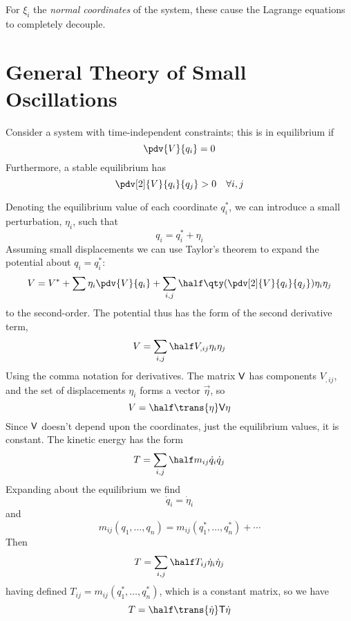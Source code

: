 For $\xi_i$ the \emph{normal coordinates} of the system, these cause
the Lagrange equations to completely decouple.

\section{General Theory of Small Oscillations}
\label{sec:general-theory-small}

Consider a system with time-independent constraints; this is in equilibrium if
\[ \pdv{V}{q_i} = 0 \]
Furthermore, a stable equilibrium has \[ \pdv[2]{V}{q_i}{q_j} > 0 \quad \forall i, j\]

Denoting the equilibrium value of each coordinate $q^{*}_i$, we can
introduce a small perturbation, $\eta_i$, such that
\begin{equation}
  \label{eq:48}
  q_i = q^{*}_i + \eta_i
\end{equation}
Assuming small displacements we can use Taylor's theorem to expand the
potential about $q_i = q_i^{*}$:
\begin{equation}
  \label{eq:49}
  V = V^{*} + \sum \eta_i \pdv{V}{q_i} + \sum_{i,j} \half \qty( \pdv[2]{V}{q_i}{q_j} ) \eta_i \eta_j
\end{equation}
to the second-order.
The potential thus has the form of the second derivative term,
\begin{equation}
  \label{eq:50}
  V = \sum_{i,j} \half V_{,ij} \eta_i \eta_j
\end{equation}
Using the comma notation for derivatives. The matrix $\mathsf{V}$ has
components $V_{,ij}$, and the set of displacements $\eta_i$ forms a
vector $\vec{\eta}$, so
\begin{equation}
  \label{eq:51}
  V = \half \trans{\eta} \mat{V} \eta
\end{equation}
Since $\mathsf{V}$ doesn't depend upon the coordinates, just the
equilibrium values, it is constant. The kinetic energy has the form
\begin{equation}
  \label{eq:52}
  T = \sum_{i,j} \half m_{ij} \dot{q}_i \dot{q}_j
\end{equation}
Expanding about the equilibrium we find
\[ \dot{q}_i = \dot{\eta}_i \] and
\[ m_{ij}(q_1, \dots, q_n) = m_{ij}(q_1^{*}, \dots, q_n^{{*}}) + \cdots \]
Then
\begin{equation}
  \label{eq:53}
  T = \sum_{i,j} \half T_{ij} \dot{\eta}_i \dot{\eta}_j
\end{equation}
having defined $T_{ij} = m_{ij}(q^*_1, \dots, q^{*}_n)$, which is a
constant matrix, so we have
\begin{equation}
  \label{eq:54}
  T = \half \trans{\dot{\eta}} \mat{T} \dot{\eta}
\end{equation}
